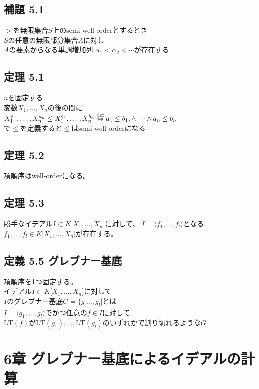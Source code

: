 \documentclass[12pt,a4paper]{article}
\begin{document}
\subsection*{補題 5.1}
  $>$を無限集合$S$上のsemi-well-orderとするとき \\
  $S$の任意の無限部分集合$A$に対し \\
  $A$の要素からなる単調増加列 $ \alpha_1 < \alpha_2 < \cdots$が存在する

\subsection*{定理 5.1}
  $n$を固定する \\
  変数$X_1 ,\ldots, X_n$の後の間に$X_1^{a_1}, \ldots, X_n^{a_n} \leq X_1^{b_1}, \ldots, X_n^{b_n} \\
  \overset{\text{def}}{\Leftrightarrow} \\
  a_1 \leq b_1, \wedge \cdots \wedge a_n \leq b_n$ \\
  で$\leq$を定義すると$\leq$はsemi-well-orderになる

\subsection*{定理 5.2}
  項順序はwell-orderになる。

\subsection*{定理 5.3}
  勝手なイデアル$I \subset K\lbrack X_1, \ldots ,X_n \rbrack$に対して、
  $I = \langle f_1, \ldots,f_l \rangle$となる$f_1 ,\ldots , f_l \in K\lbrack X_1,\ldots,X_n \rbrack$が存在する。

\subsection*{定義 5.5 グレブナー基底}
  項順序を1つ固定する。 \\
  イデアル$I \subset K \lbrack X_1, \ldots, X_n \rbrack$に対して \\
  $I$のグレブナー基底$G = \lbrace g_, \ldots , g_l \rbrack$とは \\
  $I= \langle g_1, \ldots , g_l \rangle$でかつ任意の$f \in I$に対して \\
  $\text{LT}(f)$が$\text{LT}(g_1), \ldots, \text{LT}(g_l)$のいずれかで割り切れるような$G$

\section*{6章 グレブナー基底によるイデアルの計算}
\end{document}
